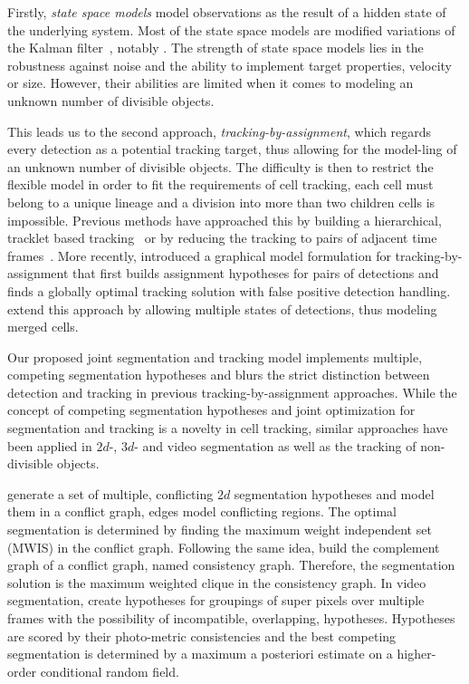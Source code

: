 Firstly, \emph{state space models} model observations as the result of a hidden state of the
underlying system. Most of the state space models are modified variations of the Kalman
filter~\citep{kalman_61_new,yang_06_nuclei}, notably
\citet{xiong_06_dynamical,arulampalam_02_tutorial,doucet_09_tutorial,ong_10_tracking,fox_06_nonparametric}. The
strength of state space models lies in the robustness against noise and the ability to implement
target properties, \eg velocity or size. However, their abilities are limited when it comes to
modeling an unknown number of divisible objects.

This leads us to the second approach, \emph{tracking-by-assignment}, which regards every detection
as a potential tracking target, thus allowing for the model-ling of an unknown number of divisible
objects. The difficulty is then to restrict the flexible model in order to fit the requirements of
cell tracking, \ie each cell must belong to a unique lineage and a division into more than two
children cells is impossible. Previous methods have approached this by building a hierarchical,
tracklet based tracking~\citep{bise_11_reliable,brendel_11_multiobject,li_09_learning} or by
reducing the tracking to pairs of adjacent time
frames~\citep{chen_06_automated,kachouie_07_extended,kanade_11_cell,padfield_11_coupled,lou_11_digital}. More
recently, \citet{kausler_12_discrete} introduced a graphical model formulation for
tracking-by-assignment that first builds assignment hypotheses for pairs of detections and finds a
globally optimal tracking solution with false positive detection
handling. \citet{schiegg_13_conservation} extend this approach by allowing multiple states of
detections, thus modeling merged cells.

Our proposed joint segmentation and tracking model implements multiple, competing segmentation
hypotheses and blurs the strict distinction between detection and tracking in previous
tracking-by-assignment approaches. While the concept of competing segmentation hypotheses and joint
optimization for segmentation and tracking is a novelty in cell tracking, similar approaches have
been applied in $2d$-, $3d$- and video segmentation as well as the tracking of non-divisible objects.

\citet{brendel_10_segmentation} generate a set of multiple, conflicting $2d$ segmentation hypotheses
and model them in a conflict graph, \ie edges model conflicting regions. The optimal segmentation is
determined by finding the maximum weight independent set (MWIS) in the conflict graph. Following the
same idea, \citet{ion_11_image} build the complement graph of a conflict graph, named consistency
graph. Therefore, the segmentation solution is the maximum weighted clique in the consistency
graph. In video segmentation, \citet{vazquez_10_multiple} create hypotheses for groupings of
super pixels over multiple frames with the possibility of incompatible, \ie overlapping,
hypotheses. Hypotheses are scored by their photo-metric consistencies and the best competing
segmentation is determined by a maximum a posteriori estimate on a higher-order conditional random
field.

